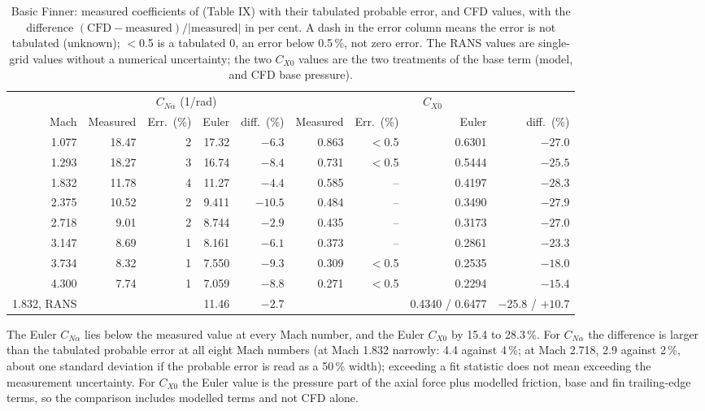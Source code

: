 \documentclass[twocolumn]{labreport}
\newcommand{\CNa}{C_{N\alpha}}
\newcommand{\CXzero}{C_{X0}}
\begin{document}
\begin{table}[t]
\centering
\caption{Basic Finner: measured coefficients of \citet{dupuis1997} (Table IX) with their tabulated probable error, and CFD values, with the difference $(\text{CFD}-\text{measured})/|\text{measured}|$ in per cent. A dash in the error column means the error is not tabulated (unknown); $<$0.5 is a tabulated 0, an error below 0.5\,\%, not zero error. The RANS values are single-grid values without a numerical uncertainty; the two $\CXzero$ values are the two treatments of the base term (model, and CFD base pressure).}
\label{tab:validation}
\begin{tabular}{@{}rrrrrrrrr@{}}
\toprule
 & \multicolumn{4}{c}{$\CNa$ (1/rad)} & \multicolumn{4}{c}{$\CXzero$} \\
\cmidrule(lr){2-5}\cmidrule(l){6-9}
Mach & Measured & Err.\ (\%) & Euler & diff.\ (\%) & Measured & Err.\ (\%) & Euler & diff.\ (\%) \\
\midrule
1.077 & 18.47 & 2 & 17.32 & $-6.3$ & 0.863 & $<$0.5 & 0.6301 & $-27.0$ \\
1.293 & 18.27 & 3 & 16.74 & $-8.4$ & 0.731 & $<$0.5 & 0.5444 & $-25.5$ \\
1.832 & 11.78 & 4 & 11.27 & $-4.4$ & 0.585 & -- & 0.4197 & $-28.3$ \\
2.375 & 10.52 & 2 & 9.411 & $-10.5$ & 0.484 & -- & 0.3490 & $-27.9$ \\
2.718 & 9.01 & 2 & 8.744 & $-2.9$ & 0.435 & -- & 0.3173 & $-27.0$ \\
3.147 & 8.69 & 1 & 8.161 & $-6.1$ & 0.373 & -- & 0.2861 & $-23.3$ \\
3.734 & 8.32 & 1 & 7.550 & $-9.3$ & 0.309 & $<$0.5 & 0.2535 & $-18.0$ \\
4.300 & 7.74 & 1 & 7.059 & $-8.8$ & 0.271 & $<$0.5 & 0.2294 & $-15.4$ \\
\midrule
1.832, RANS & & & 11.46 & $-2.7$ & & & 0.4340 / 0.6477 & $-25.8$ / $+10.7$ \\
\bottomrule
\end{tabular}
\end{table}

The Euler $\CNa$ lies below the measured value at every Mach number, and the Euler $\CXzero$ by 15.4 to 28.3\,\%.
For $\CNa$ the difference is larger than the tabulated probable error at all eight Mach numbers (at Mach 1.832 narrowly: 4.4 against 4\,\%; at Mach 2.718, 2.9 against 2\,\%, about one standard deviation if the probable error is read as a 50\,\% width); exceeding a fit statistic does not mean exceeding the measurement uncertainty.
For $\CXzero$ the Euler value is the pressure part of the axial force plus modelled friction, base and fin trailing-edge terms, so the comparison includes modelled terms and not CFD alone.
\end{document}
